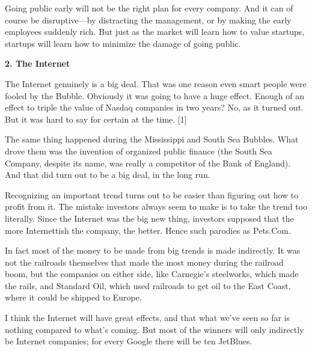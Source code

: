 Going public early
                  will not be the right plan for every company. And it can of
                  course be disruptive---by distracting the management, or
                  by making the early employees suddenly rich. But just as the
                  market will learn how to value startups, startups will learn
                  how to minimize the damage of going public.

\textbf{2. The Internet}

The Internet genuinely is a big deal. That was
                  one reason even smart people were fooled by the Bubble.
                  Obviously it was going to have a huge effect. Enough of an
                  effect to triple the value of Nasdaq companies in two years?
                  No, as it turned out. But it was hard to say for certain at
                  the time. [1]

The same thing happened during the
                  Mississippi and South Sea Bubbles. What drove them was the
                  invention of organized public finance (the South Sea Company,
                  despite its name, was really a competitor of the Bank of
                  England). And that did turn out to be a big deal, in the long
                  run.

Recognizing an important trend turns out to be
                  easier than figuring out how to profit from it. The mistake
                  investors always seem to make is to take the trend too
                  literally. Since the Internet was the big new thing, investors
                  supposed that the more Internettish the company, the better.
                  Hence such parodies as Pets.Com.

In fact most of
                  the money to be made from big trends is made indirectly. It
                  was not the railroads themselves that made the most money
                  during the railroad boom, but the companies on either side,
                  like Carnegie's steelworks, which made the rails, and Standard
                  Oil, which used railroads to get oil to the East Coast, where
                  it could be shipped to Europe.

I think the Internet
                  will have great effects, and that what we've seen so far is
                  nothing compared to what's coming. But most of the winners
                  will only indirectly be Internet companies; for every Google
                  there will be ten JetBlues.


